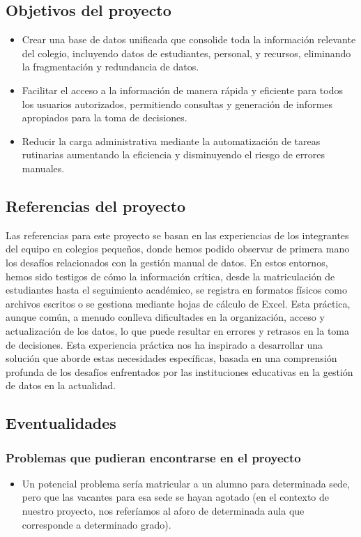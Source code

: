 \subsection{Objetivos del proyecto}
\begin{itemize}
	\item Crear una base de datos unificada que consolide toda la información relevante del colegio, incluyendo datos de estudiantes, personal, y recursos, eliminando la fragmentación y redundancia de datos.
	\item Facilitar el acceso a la información de manera rápida y eficiente para todos los usuarios autorizados, permitiendo consultas y generación de informes apropiados para la toma de decisiones.
	\item Reducir la carga administrativa mediante la automatización de tareas rutinarias aumentando la eficiencia y disminuyendo el riesgo de errores manuales.
\end{itemize}
\subsection{Referencias del proyecto}
Las referencias para este proyecto se basan en las experiencias de los integrantes del equipo en colegios pequeños, donde hemos podido observar de primera mano los desafíos relacionados con la gestión manual de datos. En estos entornos, hemos sido testigos de cómo la información crítica, desde la matriculación de estudiantes hasta el seguimiento académico, se registra en formatos físicos como archivos escritos o se gestiona mediante hojas de cálculo de Excel. Esta práctica, aunque común, a menudo conlleva dificultades en la organización, acceso y actualización de los datos, lo que puede resultar en errores y retrasos en la toma de decisiones. Esta experiencia práctica nos ha inspirado a desarrollar una solución que aborde estas necesidades específicas, basada en una comprensión profunda de los desafíos enfrentados por las instituciones educativas en la gestión de datos en la actualidad.
\subsection{Eventualidades}
\subsubsection{Problemas que pudieran encontrarse en el proyecto}
\begin{itemize}
	\item Un potencial problema sería matricular a un alumno para determinada sede, pero que las vacantes para esa sede se hayan agotado (en el contexto de nuestro proyecto, nos referíamos al aforo de determinada aula que corresponde a determinado grado).
\end{itemize}
